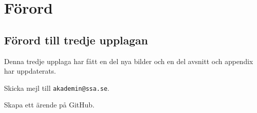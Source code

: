 \chapter*{Förord}

\balance

\section*{Förord till tredje upplagan}

Denna tredje upplaga har fått en del nya bilder och en del avsnitt och appendix har uppdaterats.

\bigskip

\begin{tcolorbox}[sidebyside,colback=white,title=Två sätt att lämna återkoppling]
\begin{center}
\end{center}

Skicka mejl till \texttt{akademin@ssa.se}.
\tcblower
\begin{center}
\end{center}

Skapa ett ärende på GitHub.
\end{tcolorbox}
